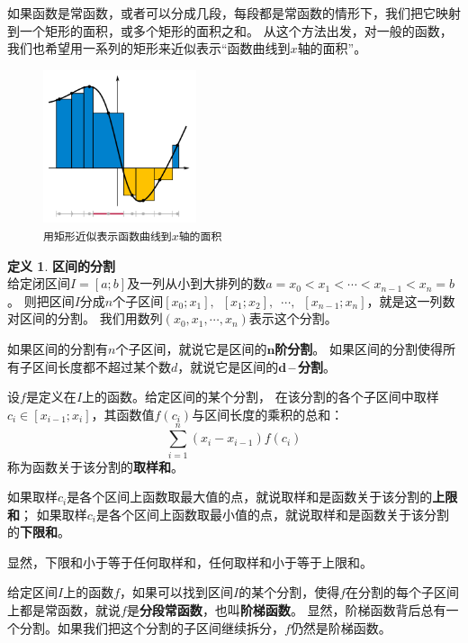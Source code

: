 \documentclass[12pt,UTF8]{ctexbook}
\theoremstyle{definition}
\newtheorem{df}{定义}[section]
\theoremstyle{plain}
\begin{document}
\begin{appendix}
如果函数是常函数，或者可以分成几段，每段都是常函数的情形下，我们把它映射到一个矩形的面积，或多个矩形的面积之和。
从这个方法出发，对一般的函数，我们也希望用一系列的矩形来近似表示“函数曲线到$x$轴的面积”。

\begin{figure}[h] %
    \vspace{4pt}
    \centering
    \includegraphics[width=0.4\textwidth]{tu/积分定义4.png}
    \caption*{\texttt{用矩形近似表示函数曲线到$x$轴的面积}}
\end{figure}

\begin{df}{\textbf{区间的分割}}
    \mbox{} \\
    给定闭区间$I=[a; b]$及一列从小到大排列的数$a = x_0 < x_1 < \cdots < x_{n-1} < x_n = b$。
    则把区间$I$分成$n$个子区间$[x_0; x_1], \,\,\, [x_1; x_2], \,\,\,\cdots, \,\,\,[x_{n-1}; x_n]$，就是这一列数对区间的分割。
    我们用数列$(x_0, x_1, \cdots, x_n)$表示这个分割。

    如果区间的分割有$n$个子区间，就说它是区间的$\boldsymbol{n}$\textbf{阶分割}。
    如果区间的分割使得所有子区间长度都不超过某个数$d$，就说它是区间的$\boldsymbol{d}$\textbf{\,–\,分割}。

    设$f$是定义在$I$上的函数。给定区间的某个分割，
    在该分割的各个子区间中取样$c_i\in [x_{i-1}; x_{i}]$，其函数值$f(c_i)$与区间长度的乘积的总和：
    $$ \sum_{i=1}^n (x_i - x_{i-1}) f(c_i) $$
    称为函数关于该分割的\textbf{取样和}。

    如果取样$c_i$是各个区间上函数取最大值的点，就说取样和是函数关于该分割的\textbf{上限和}；
    如果取样$c_i$是各个区间上函数取最小值的点，就说取样和是函数关于该分割的\textbf{下限和}。

    显然，下限和小于等于任何取样和，任何取样和小于等于上限和。

\end{df}

给定区间$I$上的函数$f$，如果可以找到区间$I$的某个分割，使得$f$在分割的每个子区间上都是常函数，就说$f$是\textbf{分段常函数}，也叫\textbf{阶梯函数}。
显然，阶梯函数背后总有一个分割。如果我们把这个分割的子区间继续拆分，$f$仍然是阶梯函数。


\end{appendix}
\end{document}
